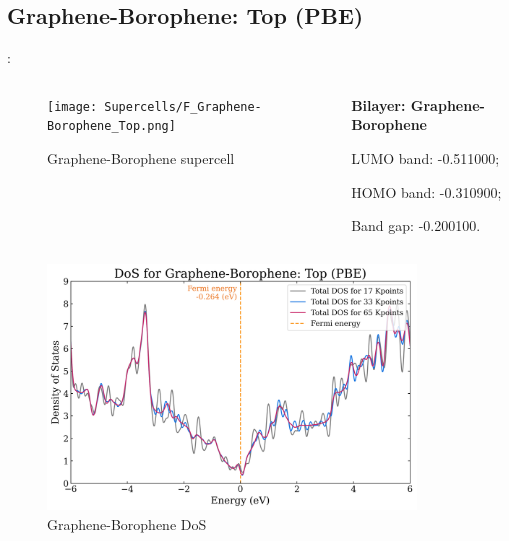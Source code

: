 \documentclass[xcolor=dvipsnames]{beamer}
\begin{document}
\subsection{Graphene-Borophene: Top (PBE)}
\begin{frame}{\insertsection: \insertsubsection}
\begin{columns}
    \begin{column}{0.5\textwidth}\begin{figure}
        \texttt{[image: Supercells/F\_Graphene-Borophene\_Top.png]}
        \caption{Graphene-Borophene supercell}
    \end{figure}\end{column}
    \begin{column}{0.5\textwidth}
        \par \textbf{Bilayer: Graphene-Borophene}
        \par\quad LUMO band: -0.511000;
        \par\quad HOMO band: -0.310900;
        \par\quad Band gap: -0.200100.
    \end{column}
\end{columns}
\begin{columns}
    \begin{column}{0.45\textwidth}\begin{figure}
        \includegraphics[width=1\textwidth]{PDoS/G-Borophene_dos.png}
        \caption{Graphene-Borophene DoS}
    \end{figure}\end{column}
    \begin{column}{0.55\textwidth}\begin{figure}

\end{figure}
\end{column}
\end{columns}
\end{frame}
\end{document}
